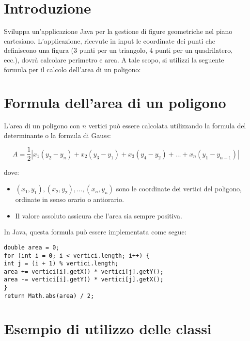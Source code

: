 \documentclass{article}
\title{}
\author{Ing. Civiletti}
\date{16/02/2025}
\begin{document}
\maketitle
\vspace{-2.5cm} %
\section*{Introduzione}
Sviluppa un'applicazione Java per la gestione di figure geometriche nel piano cartesiano. L'applicazione, ricevute in input le coordinate dei punti che definiscono una figura (3 punti per un triangolo, 4 punti per un quadrilatero, ecc.), dovrà calcolare perimetro e area.  A tale scopo, si utilizzi la seguente formula per il calcolo dell'area di un poligono:

\section*{Formula dell'area di un poligono}
L'area di un poligono con $n$ vertici può essere calcolata utilizzando la formula del determinante o la formula di Gauss:

\begin{equation}
A = \frac{1}{2} \left| x_1(y_2 - y_n) + x_2(y_3 - y_1) + x_3(y_4 - y_2) + \dots + x_n(y_1 - y_{n-1}) \right|
\end{equation}

dove:
\begin{itemize}
\item $(x_1, y_1), (x_2, y_2), \dots, (x_n, y_n)$ sono le coordinate dei vertici del poligono, ordinate in senso orario o antiorario.
\item Il valore assoluto assicura che l'area sia sempre positiva.
\end{itemize}

\noindent In Java, questa formula può essere implementata come segue:

\begin{verbatim}
double area = 0;
for (int i = 0; i < vertici.length; i++) {
int j = (i + 1) % vertici.length;
area += vertici[i].getX() * vertici[j].getY();
area -= vertici[i].getY() * vertici[j].getX();
}
return Math.abs(area) / 2;
\end{verbatim}

\section*{Esempio di utilizzo delle classi}
\end{document}
